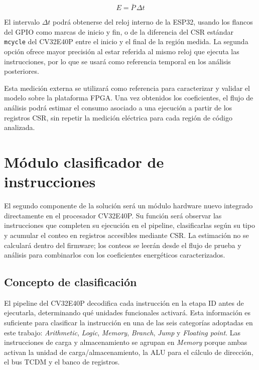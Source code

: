 \begin{equation}
    E = \bar{P}\,\Delta t
    \label{eq:energia_ventana}
\end{equation}

El intervalo $\Delta t$ podrá obtenerse del reloj interno de la ESP32, usando
los flancos del GPIO como marcas de inicio y fin, o de la diferencia del CSR
estándar \texttt{mcycle} del CV32E40P entre el inicio y el final de la región
medida. La segunda opción ofrece mayor precisión al estar referida al mismo
reloj que ejecuta las instrucciones, por lo que se usará como referencia
temporal en los análisis posteriores.

Esta medición externa se utilizará como referencia para caracterizar y validar el
modelo sobre la plataforma FPGA. Una vez obtenidos los coeficientes, el flujo de
análisis podrá estimar el consumo asociado a una ejecución a partir de los registros CSR, sin repetir la
medición eléctrica para cada región de código analizada.

\section{Módulo clasificador de instrucciones}
\label{sec:modulo_clasificador}

El segundo componente de la solución será un módulo hardware nuevo integrado
directamente en el procesador CV32E40P. Su función será observar las
instrucciones que completen su ejecución en el pipeline, clasificarlas según su
tipo y acumular el conteo en registros accesibles mediante CSR. La estimación no
se calculará dentro del firmware; los conteos se leerán desde el flujo de prueba
y análisis para combinarlos con los coeficientes energéticos caracterizados.

\subsection{Concepto de clasificación}
\label{sec:concepto_clasificacion}

El pipeline del CV32E40P decodifica cada instrucción en la etapa ID antes de
ejecutarla, determinando qué unidades funcionales activará. Esta información
es suficiente para clasificar la instrucción en una de las seis categorías
adoptadas en este trabajo: \emph{Arithmetic}, \emph{Logic}, \emph{Memory},
\emph{Branch}, \emph{Jump} y \emph{Floating point}. Las instrucciones de
carga y almacenamiento se agrupan en \emph{Memory} porque ambas activan la
unidad de carga/almacenamiento, la ALU para el cálculo de dirección, el bus
TCDM y el banco de registros.

